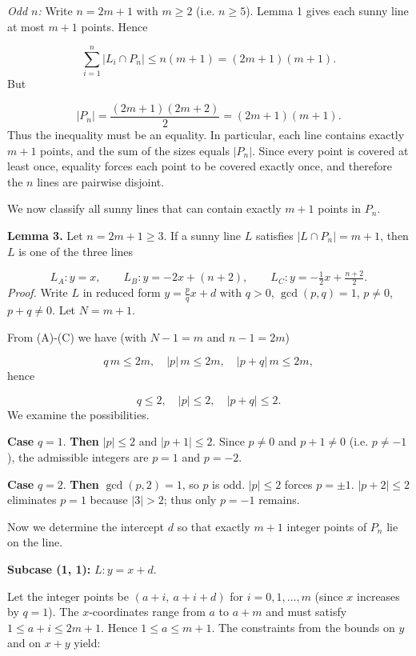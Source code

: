 \emph{Odd \(n\):} Write \(n = 2m+1\) with \(m \ge 2\) (i.e. \(n \ge 5\)). Lemma 1 gives each sunny line at most \(m+1\) points. Hence\par
\[
\sum_{i=1}^{n} |L_i \cap P_n| \le n (m+1) = (2m+1)(m+1).
\]
But\par
\[
|P_n| = \frac{(2m+1)(2m+2)}{2} = (2m+1)(m+1).
\]
Thus the inequality must be an equality. In particular, each line contains exactly \(m+1\) points, and the sum of the sizes equals \(|P_n|\). Since every point is covered at least once, equality forces each point to be covered exactly once, and therefore the \(n\) lines are pairwise disjoint.\par
We now classify all sunny lines that can contain exactly \(m+1\) points in \(P_n\).\par
\textbf{Lemma 3.} Let \(n = 2m+1 \ge 3\). If a sunny line \(L\) satisfies \(|L \cap P_n| = m+1\), then \(L\) is one of the three lines\par
\[
L_A: y = x,\qquad L_B: y = -2x + (n+2),\qquad L_C: y = -\tfrac12 x + \tfrac{n+2}{2}.
\]
\emph{Proof.} Write \(L\) in reduced form \(y = \frac{p}{q}x + d\) with \(q>0\), \(\gcd(p,q)=1\), \(p \neq 0\), \(p+q \neq 0\). Let \(N = m+1\).\par
From (A)-(C) we have (with \(N-1 = m\) and \(n-1 = 2m\))\par
\[
q\,m \le 2m,\quad |p|\,m \le 2m,\quad |p+q|\,m \le 2m,
\]
hence\par
\[
q \le 2,\quad |p| \le 2,\quad |p+q| \le 2.
\]
We examine the possibilities.\par
\textbf{Case }\(q = 1\).\textbf{ Then }\(|p| \le 2\) and \(|p+1| \le 2\). Since \(p \neq 0\) and \(p+1 \neq 0\) (i.e. \(p \neq -1\)), the admissible integers are \(p = 1\) and \(p = -2\).\par
\textbf{Case }\(q = 2\).\textbf{ Then }\(\gcd(p,2)=1\), so \(p\) is odd. \(|p| \le 2\) forces \(p = \pm 1\). \(|p+2| \le 2\) eliminates \(p = 1\) because \(|3| > 2\); thus only \(p = -1\) remains.\par
Now we determine the intercept \(d\) so that exactly \(m+1\) integer points of \(P_n\) lie on the line.\par
\smallskip
\textbf{Subcase (1, 1):} \(L: y = x + d\).\par
Let the integer points be \((a+i,\ a+i+d)\) for \(i = 0,1,\dots,m\) (since \(x\) increases by \(q=1\)). The \(x\)-coordinates range from \(a\) to \(a+m\) and must satisfy \(1 \le a+i \le 2m+1\). Hence \(1 \le a \le m+1\). The constraints from the bounds on \(y\) and on \(x+y\) yield:\par

